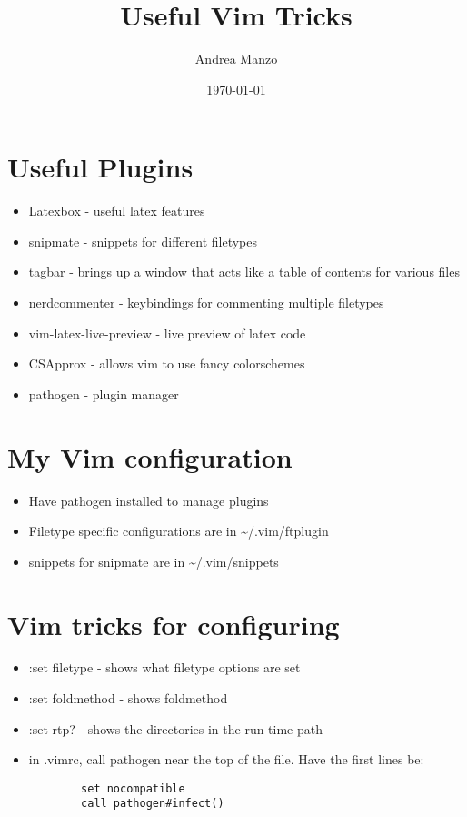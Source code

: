 \documentclass[12pt]{article}
\begin{document}
\title{Useful Vim Tricks}
\author{Andrea Manzo}
\date{\today}
\maketitle

\section{Useful Plugins}
\begin{itemize}
    \item Latexbox - useful latex features
    \item snipmate - snippets for different filetypes
    \item tagbar - brings up a window that acts like a table of contents for
        various files 
    \item nerdcommenter - keybindings for commenting multiple filetypes
    \item vim-latex-live-preview - live preview of latex code
    \item CSApprox - allows vim to use fancy colorschemes
    \item pathogen - plugin manager
\end{itemize}

\section{My Vim configuration}
\begin{itemize}
    \item Have pathogen installed to manage plugins
    \item Filetype specific configurations are in \textasciitilde/.vim/ftplugin
    \item snippets for snipmate are in \textasciitilde/.vim/snippets
\end{itemize}

\section{Vim tricks for configuring}
\begin{itemize}
    \item :set filetype - shows what filetype options are set
    \item :set foldmethod - shows foldmethod
    \item :set rtp? - shows the directories in the run time path
    \item in .vimrc, call pathogen near the top of the file. Have the first
        lines be:
\begin{verbatim}
        set nocompatible
        call pathogen#infect()
\end{verbatim}
\end{itemize}
\end{document}
